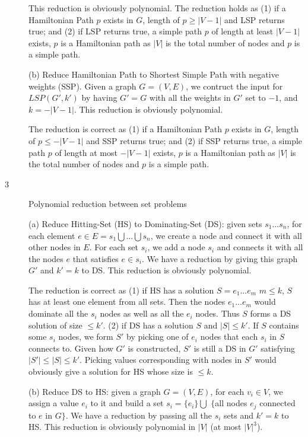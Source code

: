 \documentclass{article}
\begin{document}
\begin{description}
  This reduction is obviously polynomial. The reduction holds as (1) if a Hamiltonian Path $p$ exists in $G$, length of $p \geq |V - 1|$ and LSP returns true; and (2) if LSP returns true, a simple path $p$ of length at least $|V - 1|$ exists, $p$ is a Hamiltonian path as $|V|$ is the total number of nodes and $p$ is a simple path.

  (b) Reduce Hamiltonian Path to Shortest Simple Path with negative weights (SSP). Given a graph $G = (V, E)$, we contruct the input for $LSP(G', k')$ by having $G' = G$ with all the weights in $G'$ set to $-1$, and $k = - |V - 1|$. This reduction is obviously polynomial. 

  The reduction is correct as (1) if a Hamiltonian Path $p$ exists in $G$, length of $p \leq - |V - 1|$ and SSP returns true; and (2) if SSP returns true, a simple path $p$ of length at most $- |V - 1|$ exists, $p$ is a Hamiltonian path as $|V|$ is the total number of nodes and $p$ is a simple path.


\item[3]{Polynomial reduction between set problems}
 
  (a) Reduce Hitting-Set (HS) to Dominating-Set (DS): given sets $s_1...s_n$, for each element $e \in E = s_1 \bigcup ... \bigcup s_n$, we create a node and connect it with all other nodes in $E$. For each set $s_i$, we add a node $s_i$ and connects it with all the nodes $e$ that satisfies $e \in s_i$. We have a reduction by giving this graph $G'$ and $k' = k$ to DS. This reduction is obviously polynomial. 

  The reduction is correct as (1) if HS has a solution $S = e_1...e_m$ $m \leq k$, $S$ has at least one element from all sets. Then the nodes $e_1...e_m$ would dominate all the $s_i$ nodes as well as all the $e_i$ nodes. Thus $S$ forms a DS solution of size $\leq k'$. (2) if DS has a solution $S$ and $|S| \leq k'$. If $S$ contains some $s_i$ nodes, we form $S'$ by picking one of $e_i$ nodes that each $s_i$ in $S$ connects to. Given how $G'$ is constructed, $S'$ is still a DS in $G'$ satisfying $|S'| \leq |S| \leq k'$. Picking values corresponding with nodes in $S'$ would obviously give a solution for HS whose size is $\leq k$.

  (b) Reduce DS to HS: given a graph $G = (V, E)$, for each $v_i \in V$, we assign a value $e_i$ to it and build a set $s_i = \{e_i\} \bigcup$ $\{$all nodes $e_j$ connected to $e$ in $G\}$. We have a reduction by passing all the $s_i$ sets and $k' = k$ to HS. This reduction is obviously polynomial in $|V|$ (at most $|V|^3$).


\end{description}
\end{document}
